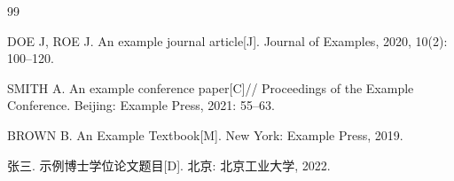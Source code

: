 \renewcommand{\bibname}{参考文献}
{\small\setlength{\parindent}{0pt}\setlength{\parskip}{0.35em}\sloppy
\begin{thebibliography}{99}

%

 DOE J, ROE J. An example journal article[J]. Journal of Examples, 2020, 10(2): 100--120.

 SMITH A. An example conference paper[C]// Proceedings of the Example Conference. Beijing: Example Press, 2021: 55--63.

 BROWN B. An Example Textbook[M]. New York: Example Press, 2019.

 张三. 示例博士学位论文题目[D]. 北京: 北京工业大学, 2022.

\end{thebibliography}
}
